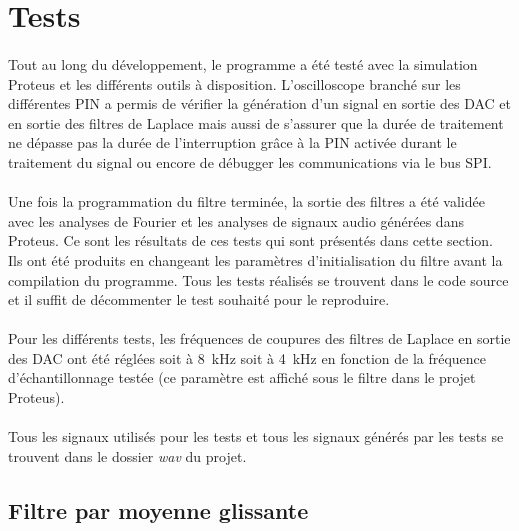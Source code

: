 \documentclass{article}
\begin{document}
    \section{Tests}
    \paragraph{}
    Tout au long du développement, le programme a été testé avec la simulation Proteus et les différents outils à disposition. L'oscilloscope branché sur les différentes PIN a permis de vérifier la génération d'un signal en sortie des DAC et en sortie des filtres de Laplace mais aussi de s'assurer que la durée de traitement ne dépasse pas la durée de l'interruption grâce à la PIN activée durant le traitement du signal ou encore de débugger les communications via le bus SPI.

    \paragraph{}
    Une fois la programmation du filtre terminée, la sortie des filtres a été validée avec les analyses de Fourier et les analyses de signaux audio générées dans Proteus. Ce sont les résultats de ces tests qui sont présentés dans cette section. Ils ont été produits en changeant les paramètres d'initialisation du filtre avant la compilation du programme. Tous les tests réalisés se trouvent dans le code source et il suffit de décommenter le test souhaité pour le reproduire.

    \paragraph{}
    Pour les différents tests, les fréquences de coupures des filtres de Laplace en sortie des DAC ont été réglées soit à \SI{8}{\kilo\hertz} soit à \SI{4}{\kilo\hertz} en fonction de la fréquence d'échantillonnage testée (ce paramètre est affiché sous le filtre dans le projet Proteus).

    \paragraph{}
    Tous les signaux utilisés pour les tests et tous les signaux générés par les tests se trouvent dans le dossier \emph{wav} du projet.


    \subsection{Filtre par moyenne glissante}
\end{document}
